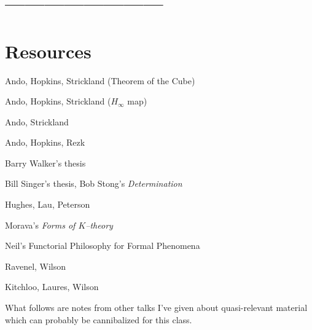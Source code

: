 \documentclass{article}
\newcommand{\<}{\langle}
\renewcommand{\>}{\rangle}
\numberwithin{equation}{section}
\theoremstyle{plain}
\theoremstyle{definition}
\theoremstyle{remark}
\begin{document}
\section*{------------------------}



\section*{Resources}

Ando, Hopkins, Strickland (Theorem of the Cube)

Ando, Hopkins, Strickland ($H_\infty$ map)

Ando, Strickland

Ando, Hopkins, Rezk

Barry Walker's thesis

Bill Singer's thesis, Bob Stong's \textit{Determination}

Hughes, Lau, Peterson

Morava's \textit{Forms of $K$--theory}

Neil's Functorial Philosophy for Formal Phenomena

Ravenel, Wilson

Kitchloo, Laures, Wilson




\newpage
\newpage
\newpage

\vspace{20\baselineskip}

\begin{center}
What follows are notes from other talks I've given about quasi-relevant material which can probably be cannibalized for this class.
\end{center}




\end{document}
